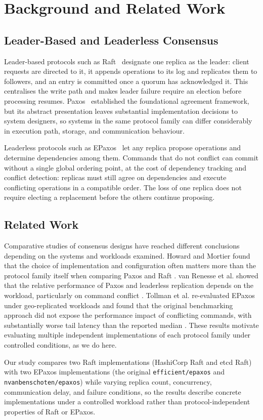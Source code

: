 \section{Background and Related Work}
\label{sec:background}

\subsection{Leader-Based and Leaderless Consensus}

Leader-based protocols such as Raft~\cite{ongaro2014raft} designate one
replica as the leader: client requests are directed to it, it appends
operations to its log and replicates them to followers, and an entry is
committed once a quorum has acknowledged it. This centralises the write path
and makes leader failure require an election before processing resumes.
Paxos~\cite{lamport1998parttime} established the foundational agreement
framework, but its abstract presentation leaves substantial implementation
decisions to system designers, so systems in the same protocol family can
differ considerably in execution path, storage, and communication behaviour.

Leaderless protocols such as EPaxos~\cite{moraru2013epaxos} let any replica
propose operations and determine dependencies among them. Commands that do
not conflict can commit without a single global ordering point, at the cost of
dependency tracking and conflict detection: replicas must still agree on
dependencies and execute conflicting operations in a compatible order. The
loss of one replica does not require electing a replacement before the others
continue proposing.

\subsection{Related Work}

Comparative studies of consensus designs have reached different conclusions
depending on the systems and workloads examined. Howard and Mortier found
that the choice of implementation and configuration often matters more than
the protocol family itself when comparing Paxos and Raft
\cite{howard2020raft}. van Renesse et al. showed that the relative
performance of Paxos and leaderless replication depends on the workload,
particularly on command conflict \cite{vanrenesse2015paxos}. Tollman et al.
re-evaluated EPaxos under geo-replicated workloads and found that the
original benchmarking approach did not expose the performance impact of
conflicting commands, with substantially worse tail latency than the
reported median \cite{tollman2021epaxos}. These results motivate evaluating
multiple independent implementations of each protocol family under
controlled conditions, as we do here.

Our study compares two Raft implementations (HashiCorp Raft and etcd Raft)
with two EPaxos implementations (the original \texttt{efficient/epaxos} and
\texttt{nvanbenschoten/epaxos}) while varying replica count, concurrency,
communication delay, and failure conditions, so the results describe concrete
implementations under a controlled workload rather than protocol-independent
properties of Raft or EPaxos.
